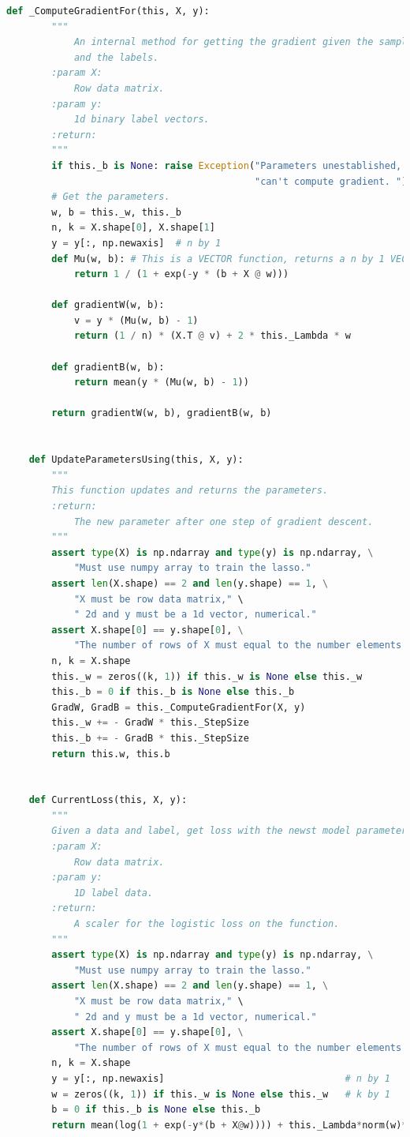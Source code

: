 \documentclass[]{article}
\begin{document}
\begin{lstlisting}[language=python]
    def _ComputeGradientFor(this, X, y):
        """
            An internal method for getting the gradient given the samples
            and the labels.
        :param X:
            Row data matrix.
        :param y:
            1d binary label vectors.
        :return:
        """
        if this._b is None: raise Exception("Parameters unestablished, "
                                            "can't compute gradient. ")
        # Get the parameters.
        w, b = this._w, this._b
        n, k = X.shape[0], X.shape[1]
        y = y[:, np.newaxis]  # n by 1
        def Mu(w, b): # This is a VECTOR function, returns a n by 1 VECTOR
            return 1 / (1 + exp(-y * (b + X @ w)))

        def gradientW(w, b):
            v = y * (Mu(w, b) - 1)
            return (1 / n) * (X.T @ v) + 2 * this._Lambda * w

        def gradientB(w, b):
            return mean(y * (Mu(w, b) - 1))

        return gradientW(w, b), gradientB(w, b)


    def UpdateParametersUsing(this, X, y):
        """
        This function updates and returns the parameters.
        :return:
            The new parameter after one step of gradient descent.
        """
        assert type(X) is np.ndarray and type(y) is np.ndarray, \
            "Must use numpy array to train the lasso."
        assert len(X.shape) == 2 and len(y.shape) == 1, \
            "X must be row data matrix," \
            " 2d and y must be a 1d vector, numerical."
        assert X.shape[0] == y.shape[0], \
            "The number of rows of X must equal to the number elements in y. "
        n, k = X.shape
        this._w = zeros((k, 1)) if this._w is None else this._w
        this._b = 0 if this._b is None else this._b
        GradW, GradB = this._ComputeGradientFor(X, y)
        this._w += - GradW * this._StepSize
        this._b += - GradB * this._StepSize
        return this.w, this.b


    def CurrentLoss(this, X, y):
        """
        Given a data and label, get loss with the newst model parameters.
        :param X:
            Row data matrix.
        :param y:
            1D label data.
        :return:
            A scaler for the logistic loss on the function.
        """
        assert type(X) is np.ndarray and type(y) is np.ndarray, \
            "Must use numpy array to train the lasso."
        assert len(X.shape) == 2 and len(y.shape) == 1, \
            "X must be row data matrix," \
            " 2d and y must be a 1d vector, numerical."
        assert X.shape[0] == y.shape[0], \
            "The number of rows of X must equal to the number elements in y. "
        n, k = X.shape
        y = y[:, np.newaxis]                                # n by 1
        w = zeros((k, 1)) if this._w is None else this._w   # k by 1
        b = 0 if this._b is None else this._b
        return mean(log(1 + exp(-y*(b + X@w)))) + this._Lambda*norm(w)**2


\end{lstlisting}
\end{document}
